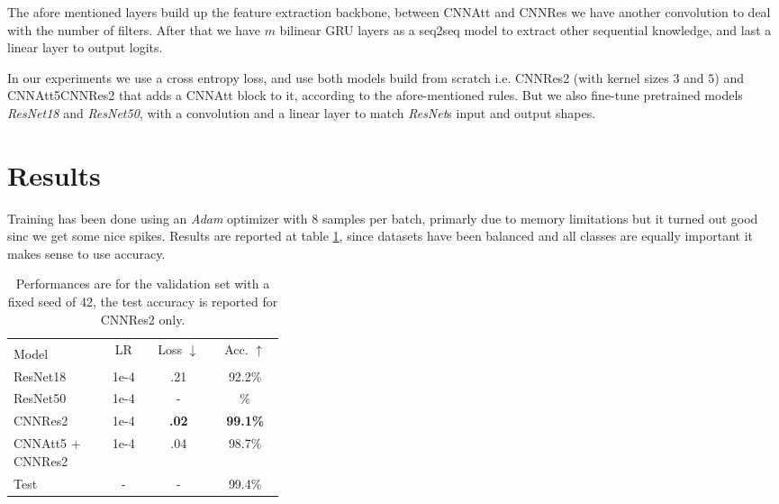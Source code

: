 \documentclass{article}
\begin{document}
The afore mentioned layers build up the feature extraction backbone, between CNNAtt and CNNRes we have another convolution to deal with the number of filters.
After that we have $m$ bilinear GRU layers as a seq2seq model to extract other sequential knowledge, and last a linear layer to output logits.

In our experiments we use a cross entropy loss, and use both models build  from scratch i.e. CNNRes2 (with kernel sizes $3$ and $5$) and CNNAtt5CNNRes2 that adds a CNNAtt block to it, according to the afore-mentioned rules.
But we also fine-tune pretrained models \textit{ResNet18} and \textit{ResNet50}, with a convolution and a linear layer to match \textit{ResNet}s input and output shapes.

\section{Results}
Training has been done using an \textit{Adam} optimizer with $8$ samples per batch, primarly due to memory limitations but it turned out good sinc we get some nice spikes.
Results are reported at table \ref{tab:joint-results}, since datasets have been balanced and all classes are equally important it makes sense to use accuracy.

\begin{table}[h!]
    \caption{Performances are for the validation set with a fixed seed of 42, the test accuracy is reported for CNNRes2 only.}
    \label{tab:joint-results}
    \begin{center}
        \begin{small}
            \begin{tabular}{p{0.35\linewidth} | ccc}
                \toprule
                & \multirow{2}{0.13\linewidth}{LR} 
                & \multirow{2}{0.13\linewidth}{Loss $\downarrow$} 
                & \multirow{2}{0.13\linewidth}{Acc. $\uparrow$} \\
                Model \\
                \midrule
                ResNet18 & 1e-4 & .21 & 92.2\% \\
                ResNet50 & 1e-4 & - & \% \\
                CNNRes2 & 1e-4 & \textbf{.02} & \textbf{99.1\%} \\
                CNNAtt5 + CNNRes2 & 1e-4 & .04 & 98.7\% \\
                \midrule
                \midrule
                Test & - & - & 99.4\% \\
                \bottomrule
            \end{tabular}
        \end{small}
    \end{center}
    \vspace{-0.5cm}
\end{table}
\end{document}
